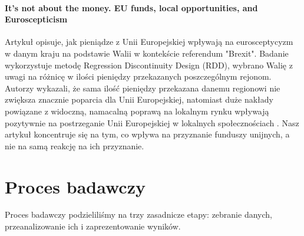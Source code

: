 \documentclass[12pt]{article}
\begin{document}
\paragraph{It’s not about the money. EU funds, local opportunities, and Euroscepticism}
Artykuł opisuje, jak pieniądze z Unii Europejskiej wpływają na eurosceptycyzm w danym kraju na podstawie Walii w kontekście referendum "Brexit". 
Badanie wykorzystuje metodę Regression Discontinuity Design (RDD), wybrano Walię z uwagi na różnicę w ilości pieniędzy przekazanych poszczególnym rejonom. 
Autorzy wykazali, że sama ilość pieniędzy przekazana danemu regionowi nie zwiększa znacznie poparcia dla Unii Europejskiej, natomiast duże nakłady powiązane z widoczną, namacalną poprawą na lokalnym rynku wpływają pozytywnie na postrzeganie Unii Europejskiej w lokalnych społecznościach \cite{6}. 
Nasz artykuł koncentruje się na tym, co wpływa na przyznanie funduszy unijnych, a nie na samą reakcję na ich przyznanie.

\section{Proces badawczy}
Proces badawczy podzieliliśmy na trzy zasadnicze etapy: zebranie danych, przeanalizowanie ich i zaprezentowanie wyników.
\end{document}
